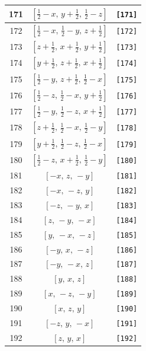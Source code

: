 \documentclass[fleqn,8pt]{jsarticle}
\begin{document}
\begin{longtable}{ccc}
171 & $\left[ \frac{1}{2} - x,\, y + \frac{1}{2},\, \frac{1}{2} - z \right]$ & {\tt [171]} \\ \hline
172 & $\left[ \frac{1}{2} - x,\, \frac{1}{2} - y,\, z + \frac{1}{2} \right]$ & {\tt [172]} \\ \hline
173 & $\left[ z + \frac{1}{2},\, x + \frac{1}{2},\, y + \frac{1}{2} \right]$ & {\tt [173]} \\ \hline
174 & $\left[ y + \frac{1}{2},\, z + \frac{1}{2},\, x + \frac{1}{2} \right]$ & {\tt [174]} \\ \hline
175 & $\left[ \frac{1}{2} - y,\, z + \frac{1}{2},\, \frac{1}{2} - x \right]$ & {\tt [175]} \\ \hline
176 & $\left[ \frac{1}{2} - z,\, \frac{1}{2} - x,\, y + \frac{1}{2} \right]$ & {\tt [176]} \\ \hline
177 & $\left[ \frac{1}{2} - y,\, \frac{1}{2} - z,\, x + \frac{1}{2} \right]$ & {\tt [177]} \\ \hline
178 & $\left[ z + \frac{1}{2},\, \frac{1}{2} - x,\, \frac{1}{2} - y \right]$ & {\tt [178]} \\ \hline
179 & $\left[ y + \frac{1}{2},\, \frac{1}{2} - z,\, \frac{1}{2} - x \right]$ & {\tt [179]} \\ \hline
180 & $\left[ \frac{1}{2} - z,\, x + \frac{1}{2},\, \frac{1}{2} - y \right]$ & {\tt [180]} \\ \hline
181 & $\left[ - x,\, z,\, - y \right]$ & {\tt [181]} \\ \hline
182 & $\left[ - x,\, - z,\, y \right]$ & {\tt [182]} \\ \hline
183 & $\left[ - z,\, - y,\, x \right]$ & {\tt [183]} \\ \hline
184 & $\left[ z,\, - y,\, - x \right]$ & {\tt [184]} \\ \hline
185 & $\left[ y,\, - x,\, - z \right]$ & {\tt [185]} \\ \hline
186 & $\left[ - y,\, x,\, - z \right]$ & {\tt [186]} \\ \hline
187 & $\left[ - y,\, - x,\, z \right]$ & {\tt [187]} \\ \hline
188 & $\left[ y,\, x,\, z \right]$ & {\tt [188]} \\ \hline
189 & $\left[ x,\, - z,\, - y \right]$ & {\tt [189]} \\ \hline
190 & $\left[ x,\, z,\, y \right]$ & {\tt [190]} \\ \hline
191 & $\left[ - z,\, y,\, - x \right]$ & {\tt [191]} \\ \hline
192 & $\left[ z,\, y,\, x \right]$ & {\tt [192]} \\
\end{longtable}
\end{document}
